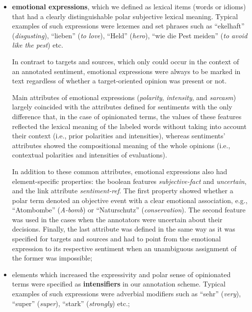 \begin{itemize}
\item
  \textbf{emotional expressions}, which we defined as lexical items
  (words or idioms) that had a clearly distinguishable polar
  subjective lexical meaning.  Typical examples of such expressions
  were lexemes and set phrases such as ``ekelhaft''
  (\emph{disgusting}), ``lieben'' (\emph{to love}), ``Held''
  (\emph{hero}), ``wie die Pest meiden'' (\emph{to avoid like the
    pest}) etc.

  In contrast to targets and sources, which only could occur in the
  context of an annotated sentiment, emotional expressions were always
  to be marked in text regardless of whether a target-oriented opinion
  was present or not.

  Main attributes of emotional expressions (\emph{polarity},
  \emph{intensity}, and \emph{sarcasm}) largely coincided with the
  attributes defined for sentiments with the only difference that, in
  the case of opinionated terms, the values of these features
  reflected the lexical meaning of the labeled words without taking
  into account their context (i.e., prior polarities and intensities),
  whereas sentiments' attributes showed the compositional meaning of
  the whole opinions (i.e., contextual polarities and intensities of
  evaluations).

  In addition to these common attributes, emotional expressions also
  had element-specific properties: the boolean features
  \emph{subjective-fact} and \emph{uncertain}, and the link attribute
  \emph{sentiment-ref}.  The first property showed whether a polar
  term denoted an objective event with a clear emotional association,
  e.g., ``Atombombe'' (\emph{A-bomb}) or ``Naturschutz''
  (\emph{conservation}).  The second feature was used in the cases
  when the annotators were uncertain about their decisions.  Finally,
  the last attribute was defined in the same way as it was specified
  for targets and sources and had to point from the emotional
  expression to its respective sentiment when an unambiguous
  assignment of the former was impossible;

\item
  elements which increased the expressivity and polar sense of
  opinionated terms were specified as \textbf{intensifiers} in our
  annotation scheme.  Typical examples of such expressions were
  adverbial modifiers such as ``sehr'' (\emph{very}), ``super''
  (\emph{super}), ``stark'' (\emph{strongly}) etc.;


\end{itemize}
